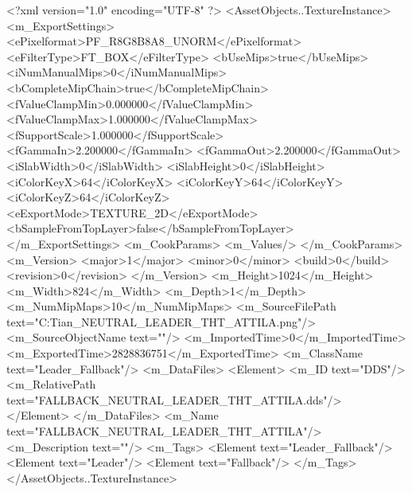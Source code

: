 <?xml version="1.0" encoding="UTF-8" ?>
<AssetObjects..TextureInstance>
	<m_ExportSettings>
		<ePixelformat>PF_R8G8B8A8_UNORM</ePixelformat>
		<eFilterType>FT_BOX</eFilterType>
		<bUseMips>true</bUseMips>
		<iNumManualMips>0</iNumManualMips>
		<bCompleteMipChain>true</bCompleteMipChain>
		<fValueClampMin>0.000000</fValueClampMin>
		<fValueClampMax>1.000000</fValueClampMax>
		<fSupportScale>1.000000</fSupportScale>
		<fGammaIn>2.200000</fGammaIn>
		<fGammaOut>2.200000</fGammaOut>
		<iSlabWidth>0</iSlabWidth>
		<iSlabHeight>0</iSlabHeight>
		<iColorKeyX>64</iColorKeyX>
		<iColorKeyY>64</iColorKeyY>
		<iColorKeyZ>64</iColorKeyZ>
		<eExportMode>TEXTURE_2D</eExportMode>
		<bSampleFromTopLayer>false</bSampleFromTopLayer>
	</m_ExportSettings>
	<m_CookParams>
		<m_Values/>
	</m_CookParams>
	<m_Version>
		<major>1</major>
		<minor>0</minor>
		<build>0</build>
		<revision>0</revision>
	</m_Version>
	<m_Height>1024</m_Height>
	<m_Width>824</m_Width>
	<m_Depth>1</m_Depth>
	<m_NumMipMaps>10</m_NumMipMaps>
	<m_SourceFilePath text="C:\Users\Troy Tian\Downloads\FALLBACK_NEUTRAL_LEADER_THT_ATTILA.png"/>
	<m_SourceObjectName text=""/>
	<m_ImportedTime>0</m_ImportedTime>
	<m_ExportedTime>2828836751</m_ExportedTime>
	<m_ClassName text="Leader_Fallback"/>
	<m_DataFiles>
		<Element>
			<m_ID text="DDS"/>
			<m_RelativePath text="FALLBACK_NEUTRAL_LEADER_THT_ATTILA.dds"/>
		</Element>
	</m_DataFiles>
	<m_Name text="FALLBACK_NEUTRAL_LEADER_THT_ATTILA"/>
	<m_Description text=""/>
	<m_Tags>
		<Element text="Leader_Fallback"/>
		<Element text="Leader"/>
		<Element text="Fallback"/>
	</m_Tags>
</AssetObjects..TextureInstance>

